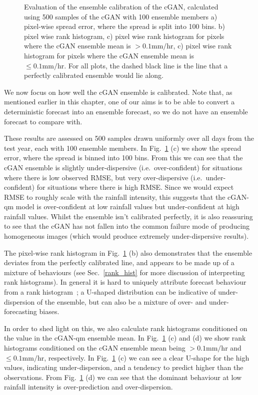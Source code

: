 \documentclass[../main.tex]{subfiles}
\begin{document}
\begin{figure}[!ht]
     
     \caption{Evaluation of the ensemble calibration of the cGAN, calculated using 500 samples of the cGAN with 100 ensemble members a) pixel-wise spread error, where the spread is split into 100 bins. b) pixel wise rank histogram, c) pixel wise rank histogram for pixels where the cGAN ensemble mean is $>0.1\text{mm/hr}$, c) pixel wise rank histogram for pixels where the cGAN ensemble mean is $\leq 0.1\text{mm/hr}$. For all plots, the dashed black line is the line that a perfectly calibrated ensemble would lie along. }
     \label{fig:ens_calib}
\end{figure}


We now focus on how well the cGAN ensemble is calibrated. Note that, as mentioned earlier in this chapter, one of our aims is to be able to convert a deterministic forecast into an ensemble forecast, so we do not have an ensemble forecast to compare with.

These results are assessed on 500 samples drawn uniformly over all days from the test year, each with 100 ensemble members. In Fig.~\ref{fig:ens_calib} (c) we show the spread error, where the spread is binned into 100 bins. From this we can see that the cGAN ensemble is slightly under-dispersive (i.e.~over-confident) for situations where there is low observed RMSE, but very over-dispersive (i.e.~under-confident) for situations where there is high RMSE. Since we would expect RMSE to roughly scale with the rainfall intensity, this suggests that the cGAN-qm model is over-confident at low rainfall values but under-confident at high rainfall values. Whilst the ensemble isn't calibrated perfectly, it is also reassuring to see that the cGAN has not fallen into the common failure mode of producing homogeneous images (which would produce extremely under-dispersive results).

The pixel-wise rank histogram in Fig.~\ref{fig:ens_calib} (b) also demonstrates that the ensemble deviates from the perfectly calibrated line, and appears to be made up of a mixture of behaviours (see Sec.~\ref{rank_hist} for more discussion of interpreting rank histograms). In general it is hard to uniquely attribute forecast behaviour from a rank histogram~\citep{hamill_interpretation_2001}; a U-shaped distribution can be indicative of under-dispersion of the ensemble, but can also be a mixture of over- and under-forecasting biases. 

In order to shed light on this, we also calculate rank histograms conditioned on the value in the cGAN-qm ensemble mean. In Fig.~\ref{fig:ens_calib} (c) and (d) we show rank histograms conditioned on the cGAN ensemble mean being $>0.1\text{mm/hr}$ and $\leq 0.1\text{mm/hr}$, respectively. In Fig.~\ref{fig:ens_calib} (c) we can see a clear U-shape for the high values, indicating under-dispersion, and a tendency to predict higher than the observations. From Fig.~\ref{fig:ens_calib} (d) we can see that the dominant behaviour at low rainfall intensity is over-prediction and over-dispersion. 
\end{document}

